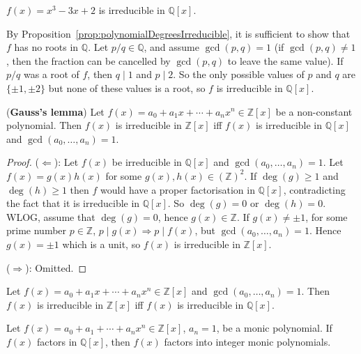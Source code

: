 \begin{example}
	$f(x) = x^3 - 3x + 2$ is irreducible in $\mathbb{Q}[x]$.
	
	By Proposition~\ref{prop:polynomialDegreesIrreducible}, it is sufficient to show that $f$ has no roots in $\mathbb{Q}$. Let $p/q \in \mathbb{Q}$, and assume $\gcd(p, q) = 1$ (if $\gcd(p, q) \ne 1$, then the fraction can be cancelled by $\gcd(p, q)$ to leave the same value). If $p/q$ was a root of $f$, then $q \mid 1$ and $p \mid 2$. So the only possible values of $p$ and $q$ are $\{ \pm 1, \pm 2 \}$ but none of these values is a root, so $f$ is irreducible in $\mathbb{Q}[x]$.
\end{example}

\begin{lemma}\label{lem:GaussLemma}
	(\textbf{Gauss's lemma}) Let $f(x) = a_0 + a_1 x + \cdots + a_n x^n \in \mathbb{Z}[x]$ be a non-constant polynomial. Then $f(x)$ is irreducible in $\mathbb{Z}[x]$ iff $f(x)$ is irreducible in $\mathbb{Q}[x]$ and $\gcd(a_0, \dots, a_n) = 1$.
\end{lemma}

\begin{proof}
	($\Longleftarrow$): Let $f(x)$ be irreducible in $\mathbb{Q}[x]$ and $\gcd(a_0, \dots, a_n) = 1$. Let $f(x) = g(x) h(x)$ for some $g(x), h(x) \in {(\mathbb{Z})}^2$. If $\deg(g) \ge 1$ and $\deg(h) \ge 1$ then $f$ would have a proper factorisation in $\mathbb{Q}[x]$, contradicting the fact that it is irreducible in $\mathbb{Q}[x]$. So $\deg(g) = 0$ or $\deg(h) = 0$. WLOG, assume that $\deg(g) = 0$, hence $g(x) \in \mathbb{Z}$. If $g(x) \ne \pm 1$, for some prime number $p \in \mathbb{Z}$, $p \mid g(x) \Longrightarrow p \mid f(x)$, but $\gcd(a_0, \dots, a_n) = 1$. Hence $g(x) = \pm 1$ which is a unit, so $f(x)$ is irreducible in $\mathbb{Z}[x]$.

	($\Longrightarrow$): Omitted.
\end{proof}

\begin{corollary}\label{cor:coprimeCoeffsPolynomialIrreducibleInZAndQ}
	Let $f(x) = a_0 + a_1 x + \cdots + a_n x^n \in \mathbb{Z}[x]$ and $\gcd(a_0, \dots, a_n) = 1$. Then $f(x)$ is irreducible in $\mathbb{Z}[x]$ iff $f(x)$ is irreducible in $\mathbb{Q}[x]$.
\end{corollary}

\begin{lemma}
	Let $f(x) = a_0 + a_1 + \cdots + a_n x^n \in \mathbb{Z}[x]$, $a_n = 1$, be a monic polynomial. If $f(x)$ factors in $\mathbb{Q}[x]$, then $f(x)$ factors into integer monic polynomials.
\end{lemma}

